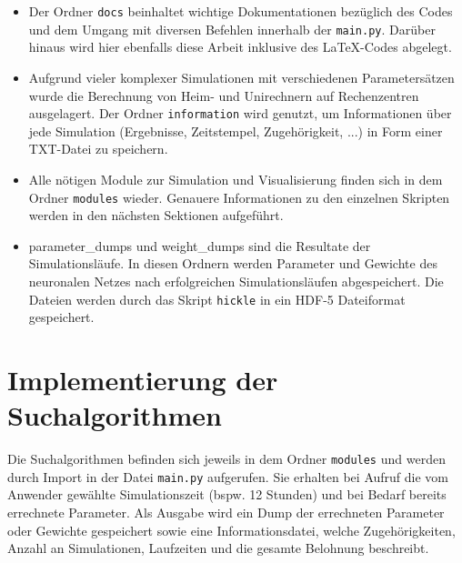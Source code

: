 	\begin{minipage}{0.65\textwidth}
		\begin{itemize}
			\item Der Ordner \texttt{docs} beinhaltet wichtige Dokumentationen bezüglich des Codes und dem Umgang mit diversen Befehlen innerhalb der \texttt{main.py}. Darüber hinaus wird hier ebenfalls diese Arbeit inklusive des \LaTeX-Codes abgelegt.
			\item Aufgrund vieler komplexer Simulationen mit verschiedenen Parametersätzen wurde die Berechnung von Heim- und Unirechnern auf Rechenzentren ausgelagert. Der Ordner \texttt{information} wird genutzt, um Informationen über jede Simulation (Ergebnisse, Zeitstempel, Zugehörigkeit, ...) in Form einer TXT-Datei zu speichern.
			\item Alle nötigen Module zur Simulation und Visualisierung finden sich in dem Ordner \texttt{modules} wieder. Genauere Informationen zu den einzelnen Skripten werden in den nächsten Sektionen aufgeführt.
			\item parameter\_dumps und weight\_dumps sind die Resultate der Simulationsläufe. In diesen Ordnern werden Parameter und Gewichte des neuronalen Netzes nach erfolgreichen Simulationsläufen abgespeichert. Die Dateien werden durch das Skript \texttt{hickle} in ein HDF-5 Dateiformat \cite{hdf5} gespeichert.
		\end{itemize}		
	\end{minipage}
	
	
		
\section{Implementierung der Suchalgorithmen}
\label{sec:imp_search}
	Die Suchalgorithmen befinden sich jeweils in dem Ordner \texttt{modules} und werden durch Import in der Datei \texttt{main.py} aufgerufen. Sie erhalten bei Aufruf die vom Anwender gewählte Simulationszeit (bspw. 12 Stunden) und bei Bedarf bereits errechnete Parameter. Als Ausgabe wird ein Dump der errechneten Parameter oder Gewichte gespeichert sowie eine Informationsdatei, welche Zugehörigkeiten, Anzahl an Simulationen, Laufzeiten und die gesamte Belohnung beschreibt. 
	
